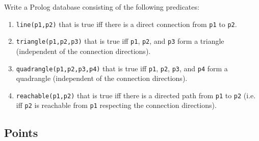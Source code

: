 \documentclass [11pt, a4wide, twoside]{article}
\begin{document}
Write a Prolog database consisting of the following predicates:

\begin{enumerate}
\renewcommand{\theenumi}{\alph{enumi}}

\item \texttt{line(p1,p2)} that is true iff there is a direct connection from \texttt{p1} to \texttt{p2}.

\item \texttt{triangle(p1,p2,p3)} that is true iff \texttt{p1}, \texttt{p2}, and \texttt{p3} form a triangle (independent of the connection directions).

\item \texttt{quadrangle(p1,p2,p3,p4)} that is true iff \texttt{p1}, \texttt{p2}, \texttt{p3}, and \texttt{p4} form a quadrangle (independent of the connection directions).

\item \texttt{reachable(p1,p2)} that is true iff there is a directed path from \texttt{p1} to \texttt{p2} (i.e. iff \texttt{p2} is reachable from \texttt{p1} respecting the connection directions).
\end{enumerate}

\solution{}

\newpage
\subsection*{Points}
\end{document}
